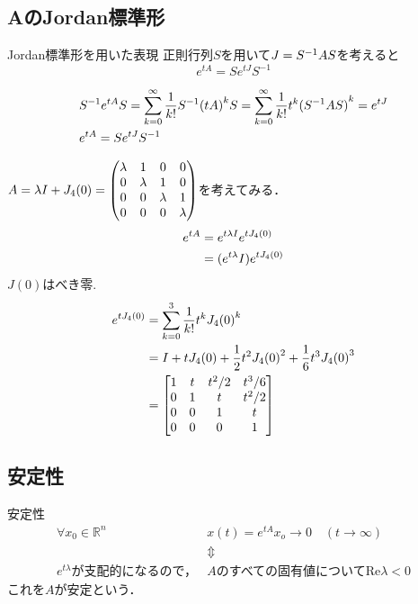 \subsection{AのJordan標準形}
\begin{itembox}[l]{Jordan標準形を用いた表現}
正則行列$S$を用いて$J={S}^{-1}AS$を考えると
\begin{equation}
    e^{tA} = Se^{tJ}S^{-1}
\end{equation}
\end{itembox}

\begin{align}
  &{S}^{-1}e^{tA}S=\displaystyle\sum_{k=0}^{\infty}\frac{1}{k!}{S}^{-1}{(tA)}^k S=\sum_{k=0}^{\infty}\frac{1}{k!}t^k {({S}^{-1}AS)}^k = e^{tJ}\\
  &e^{tA}=Se^{tJ}{S}^{-1}
\end{align}

$A=\lambda I +J_4 (0)=
\begin{pmatrix}
  \lambda&1&0&0\\
  0&\lambda&1&0\\
  0&0&\lambda&1\\
  0&0&0&\lambda
\end{pmatrix}$を考えてみる．
\begin{align}
  e^{tA}&=e^{t\lambda I}e^{tJ_4 (0)}\\
  &=(e^{t\lambda}I )e^{tJ_4 (0)}
 \end{align}
 $J(0)$はべき零.
 \begin{align}
  e^{tJ_4 (0)}&=\sum_{k=0}^3 \frac{1}{k!}t^k {J_4 (0)}^k\\
  &=I +tJ_4 (0)+\displaystyle\frac{1}{2}t^2 {J_4 (0)}^2 +\frac{1}{6}t^3 {J_4 (0)}^3\\
  &= \begin{bmatrix}
    1 & t & t^2/2 & t^3/6\\
    0 & 1 & t & t^2/2\\
    0 & 0 & 1 & t\\
    0 & 0 & 0 & 1
  \end{bmatrix}
\end{align}
\subsection{安定性}
\begin{itembox}[l]{安定性}
\begin{align}
    \forall x_0 \in \mathbb{R}^n \quad 
    & x(t) = e^{tA}x_o \rightarrow 0 \quad (t\rightarrow \infty)\\
    &\Updownarrow\\
    e^{t\lambda} \text{が支配的になるので，}&A\text{のすべての固有値について}
    \mathrm{Re} \lambda < 0
\end{align}
これを$A$が安定という．
\end{itembox}
